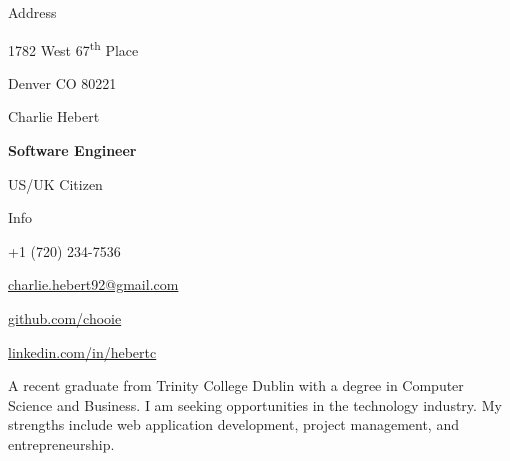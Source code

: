 \noindent
\begin{minipage}[t]{0.333\textwidth}
  {\huge Address}

  \setlength{\parskip}{0.4cm}

  1782 West 67\textsuperscript{th} Place
  
  Denver CO 80221
\end{minipage}
\noindent
\begin{minipage}[t]{0.333\textwidth}
  \vspace*{\fill}
  \begin{center}
    {\Huge Charlie Hebert}

    \setlength{\parskip}{0.5cm}
    
    \textbf{Software Engineer}
    
    US/UK Citizen
  \end{center}
  \vspace*{\fill}
\end{minipage}
\noindent
\begin{minipage}[t]{0.333\textwidth}
  \begin{flushright}
    {\huge Info}\\
  \end{flushright}

  \begin{description}
    \raggedleft
    \item[Mobile] +1 (720) 234-7536
    \item[Email] \href{mailto:charlie.hebert92@gmail.com}{charlie.hebert92@gmail.com}
    \item[Github] \href{http://www.github.com/chooie}{github.com/chooie}
    \item[LinkedIn] \href{http://linkedin.com/in/hebertc}{linkedin.com/in/hebertc}
  \end{description}
\end{minipage}

\begin{center}
  A recent graduate from Trinity College Dublin with a degree in Computer Science and Business. I am seeking opportunities in the technology industry. My strengths include web application development, project management, and entrepreneurship.
\end{center}

